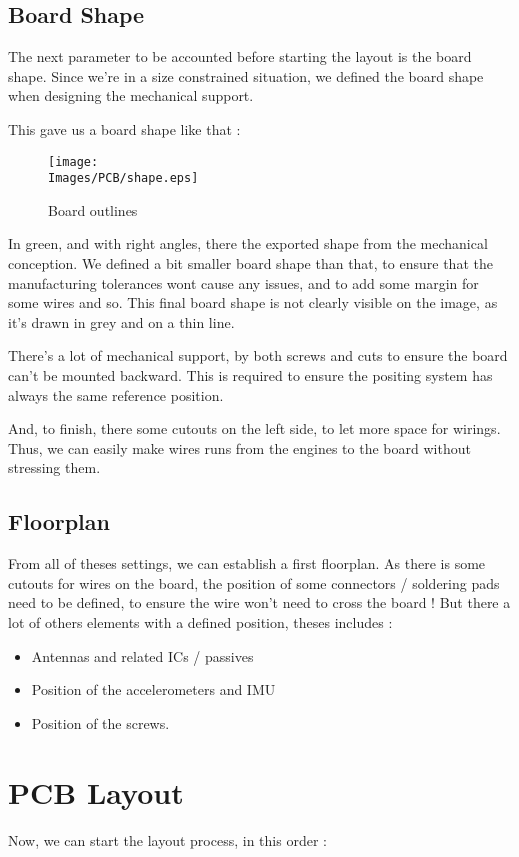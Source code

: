 \subsection{Board Shape}
The next parameter to be accounted before starting the layout is the board shape. Since 
we're in a size constrained situation, we defined the board shape when designing the 
mechanical support.

This gave us a board shape like that : 

\begin{figure}
    \centering
    \texttt{[image: \\Images/PCB/shape.eps]}
    \caption{Board outlines}
    \label{img:board_shape}
\end{figure}

In green, and with right angles, there the exported shape from the mechanical conception.
We defined a bit smaller board shape than that, to ensure that the manufacturing tolerances
wont cause any issues, and to add some margin for some wires and so. This final board shape
is not clearly visible on the image, as it's drawn in grey and on a thin line.

There's a lot of mechanical support, by both screws and cuts to ensure the board can't be 
mounted backward. This is required to ensure the positing system has always the same 
reference position.

And, to finish, there some cutouts on the left side, to let more space for wirings. Thus, we
can easily make wires runs from the engines to the board without stressing them.

\subsection{Floorplan}
From all of theses settings, we can establish a first floorplan. As there is some cutouts for 
wires on the board, the position of some connectors / soldering pads need to be defined, to 
ensure the wire won't need to cross the board !
But there a lot of others elements with a defined position, theses includes : 

\begin{itemize}
    \item   Antennas and related ICs / passives 
    \item   Position of the accelerometers and IMU
    \item   Position of the screws.
\end{itemize}

\section{PCB Layout}
Now, we can start the layout process, in this order : 

